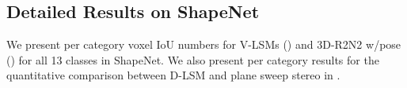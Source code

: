 \subsection{Detailed Results on ShapeNet}
We present per category voxel IoU numbers for V-LSMs () and 3D-R2N2 w/pose () for all 13 classes in ShapeNet. We also present per category results for the quantitative comparison between D-LSM and plane sweep stereo in .



